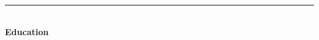 \documentclass[10pt]{article}
\newenvironment{itemize*}%
  {\begin{itemize}%
    \setlength{\itemsep}{0pt}%
    \setlength{\parskip}{0pt}%
	}
  {\end{itemize}}
\begin{document}
\begin{itemize*}
\end{itemize*}
\rule{7.0in}{2pt}
\\
\vspace{0.10in}
{\large \textbf{Education}}
\end{document}
